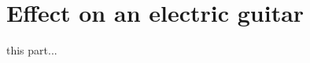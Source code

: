 

\section{Effect on an electric guitar}
this part...

\label{sec:equalizing} 
\label{sec:delay} 
\label{sec:reverberation} 
\label{sec:overdrive} 
\label{sec:chorus} 
\label{sec:wah-wah} 

